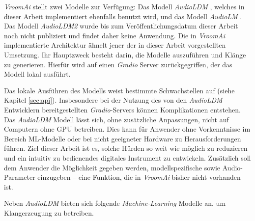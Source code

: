 \documentclass[
  a4paper,  %
  twoside,  %
  bibliography=totoc,
  headsepline,
  cleardoublepage=empty,
  parskip=half,
  draft=false
]{scrbook}
\begin{document}
\emph{VroomAi} stellt zwei Modelle zur Verfügung: Das Modell \emph{AudioLDM} \cite{liu_audioldm_2023}, welches in dieser Arbeit implementiert ebenfalls benutzt wird, und das Modell \emph{AudioLM} \cite{borsos_audiolm_2022}. Das Modell \emph{AudioLDM2} wurde bis zum Veröffentlichungsdatum dieser Arbeit noch nicht publiziert und findet daher keine Anwendung. Die in \emph{VroomAi} implementierte Architektur ähnelt jener der in dieser Arbeit vorgestellten Umsetzung. Ihr Hauptzweck besteht darin, die Modelle auszuführen und Klänge zu generieren. Hierfür wird auf einen \emph{Gradio} Server \cite{team_gradio_gradio_nodate} zurückgegriffen, der das Modell lokal ausführt.

Das lokale Ausführen des Modells weist bestimmte Schwachstellen auf (siehe Kapitel \ref{sec:api}). Insbesondere bei der Nutzung des von den \emph{AudioLDM} Entwicklern bereitgestellten \emph{Gradio}-Servers können Komplikationen entstehen. Das \emph{AudioLDM} Modell lässt sich, ohne zusätzliche Anpassungen, nicht auf Computern ohne GPU betreiben. Dies kann für Anwender ohne Vorkenntnisse im Bereich ML-Modelle oder bei nicht geeigneter Hardware zu Herausforderungen führen. Ziel dieser Arbeit ist es, solche Hürden so weit wie möglich zu reduzieren und ein intuitiv zu bedienendes digitales Instrument zu entwickeln. Zusätzlich soll dem Anwender die Möglichkeit gegeben werden, modellspezifische sowie Audio-Parameter einzugeben – eine Funktion, die in \emph{VroomAi} bisher nicht vorhanden ist.

Neben \emph{AudioLDM} \cite{liu_audioldm_2023} bieten sich folgende \emph{Machine-Learning} Modelle an, um Klangerzeugung zu betreiben.
\end{document}
